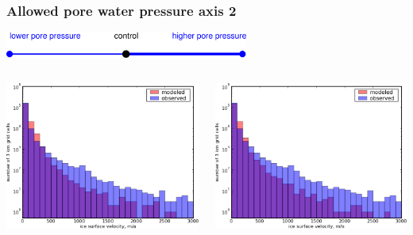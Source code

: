 \documentclass{beamer}
\begin{document}
\begin{frame}
  \frametitle{Allowed pore water pressure axis 2}

\vspace{-0.1in}
\begin{center}
  \includegraphics[width=0.6\textwidth]{pore_pressure_axis}
\end{center}

\vspace{-0.1in}
\begin{columns}
\begin{column}{0.33\textwidth}
\begin{center}
  \includegraphics[width=1.0\textwidth]{g3km_3_25_95_hist}
\end{center}
\end{column}
\begin{column}{0.33\textwidth}
\begin{center}
  \includegraphics[width=1.0\textwidth]{g3km_3_25_98_hist}

\end{center}
\end{column}
\end{columns}
\end{frame}
\end{document}
